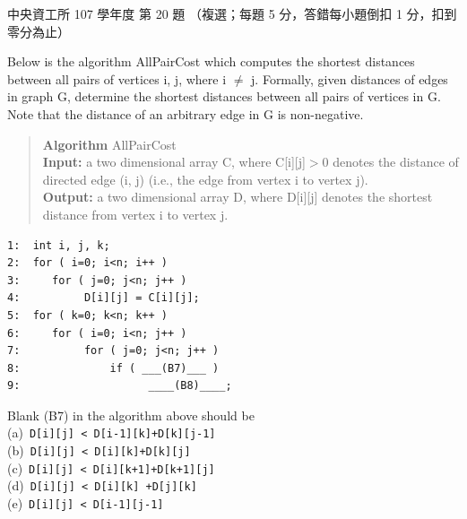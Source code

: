 \begin{pastexam}[label={px:ncu-107-dsa-20}]{中央資工所 107 學年度 第 20 題}
（複選；每題 5 分，答錯每小題倒扣 1 分，扣到零分為止）

Below is the algorithm AllPairCost which computes the shortest distances between all pairs of
vertices i, j, where i $\ne$ j. Formally, given distances of edges in graph G, determine the
shortest distances between all pairs of vertices in G. Note that the distance of an arbitrary edge
in G is non-negative.
\begin{quote}
\textbf{Algorithm} AllPairCost\\
\textbf{Input:} a two dimensional array C, where C[i][j]$>$0 denotes the distance of directed edge
(i, j) (i.e., the edge from vertex i to vertex j).\\
\textbf{Output:} a two dimensional array D, where D[i][j] denotes the shortest distance from
vertex i to vertex j.
\end{quote}
\begin{verbatim}
1:  int i, j, k;
2:  for ( i=0; i<n; i++ )
3:     for ( j=0; j<n; j++ )
4:          D[i][j] = C[i][j];
5:  for ( k=0; k<n; k++ )
6:     for ( i=0; i<n; j++ )
7:          for ( j=0; j<n; j++ )
8:              if ( ___(B7)___ )
9:                    ____(B8)____;
\end{verbatim}

Blank (B7) in the algorithm above should be\\
(a)~\texttt{D[i][j] < D[i-1][k]+D[k][j-1]}\\
(b)~\texttt{D[i][j] < D[i][k]+D[k][j]}\\
(c)~\texttt{D[i][j] < D[i][k+1]+D[k+1][j]}\\
(d)~\texttt{D[i][j] < D[i][k] +D[j][k]}\\
(e)~\texttt{D[i][j] < D[i-1][j-1]}
\end{pastexam}

